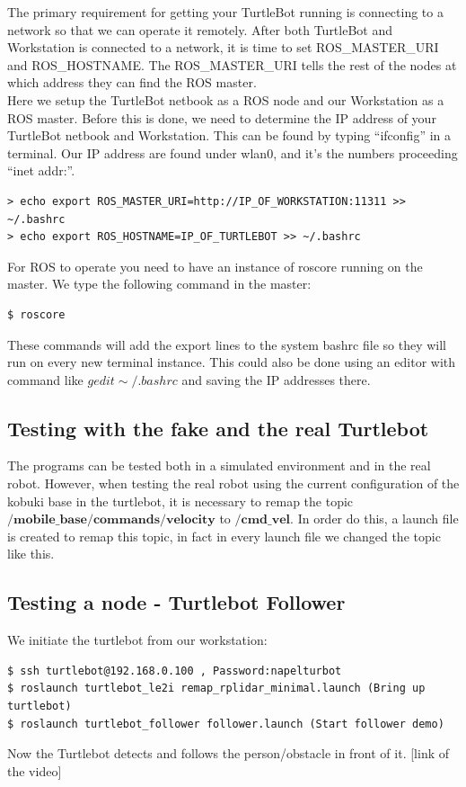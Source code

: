 \documentclass[10pt,a4paper]{article}
\begin{document}
The primary requirement for getting your TurtleBot running is connecting to a network so that we can operate it remotely. After both TurtleBot and Workstation is connected to a network, it is time to set ROS\_MASTER\_URI and ROS\_HOSTNAME. The ROS\_MASTER\_URI tells the rest of the nodes at which address they can find the ROS master.\\

Here we setup the TurtleBot netbook as a ROS node and our Workstation as a ROS master. Before this is done, we need to determine the IP address of your TurtleBot netbook and Workstation. This can be found by typing ``ifconfig'' in a terminal. Our IP address are found under wlan0, and it's the numbers proceeding ``inet addr:''.

\begin{lstlisting}[frame=single] 
> echo export ROS_MASTER_URI=http://IP_OF_WORKSTATION:11311 >> ~/.bashrc
> echo export ROS_HOSTNAME=IP_OF_TURTLEBOT >> ~/.bashrc
\end{lstlisting}
For ROS to operate you need to have an instance of roscore running on the master. We type the following command in the master:

\begin{lstlisting}[frame=single] 
$ roscore
\end{lstlisting}
These commands will add the export lines to the system bashrc file so they will run on every new terminal instance. This could also be done using an editor with command like $gedit \sim/.bashrc$ and saving the IP addresses there.

\subsection{Testing with the fake and the real Turtlebot}
The programs can be tested both in a simulated environment and in the real robot. However, when testing the real robot using the current configuration of the kobuki base in the turtlebot, it is necessary to remap the topic $\textbf{/mobile\_base/commands/velocity}$ to $/\textbf{cmd\_vel}$. In order do this, a launch file is created to remap this topic, in fact in every launch file we changed the topic like this.

\subsection{Testing a node - Turtlebot Follower}
We initiate the turtlebot from our workstation:
\begin{lstlisting}[frame=single]
$ ssh turtlebot@192.168.0.100 , Password:napelturbot
$ roslaunch turtlebot_le2i remap_rplidar_minimal.launch (Bring up turtlebot)
$ roslaunch turtlebot_follower follower.launch (Start follower demo)
\end{lstlisting}
Now the Turtlebot detects and follows the person/obstacle in front of it.
[link of the video]
\end{document}
